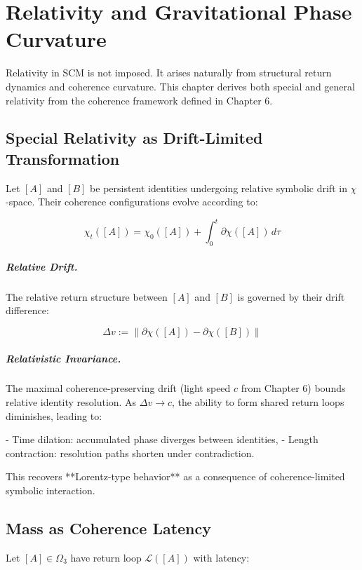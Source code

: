 \chapter{Relativity and Gravitational Phase Curvature} \label{chapter:relativity-from-curvature}

Relativity in SCM is not imposed. It arises naturally from structural return dynamics and coherence curvature. This chapter derives both special and general relativity from the coherence framework defined in Chapter 6.

\section{Special Relativity as Drift-Limited Transformation}

Let $[A]$ and $[B]$ be persistent identities undergoing relative symbolic drift in $\chi$-space. Their coherence configurations evolve according to:

\[
\chi_t([A]) = \chi_0([A]) + \int_0^t \partial \chi([A])\,d\tau
\]

\paragraph{Relative Drift.}
The relative return structure between $[A]$ and $[B]$ is governed by their drift difference:

\[
\Delta v := \|\partial \chi([A]) - \partial \chi([B])\|
\]

\paragraph{Relativistic Invariance.}
The maximal coherence-preserving drift (light speed $c$ from Chapter 6) bounds relative identity resolution. As $\Delta v \to c$, the ability to form shared return loops diminishes, leading to:

- Time dilation: accumulated phase diverges between identities,
- Length contraction: resolution paths shorten under contradiction.

This recovers **Lorentz-type behavior** as a consequence of coherence-limited symbolic interaction.

\section{Mass as Coherence Latency}

Let $[A] \in \Omega_3$ have return loop $\mathcal{L}([A])$ with latency:

